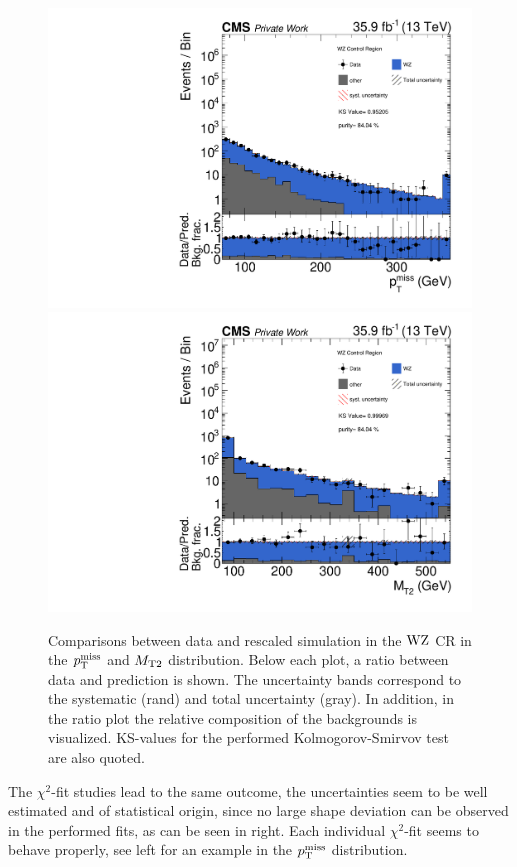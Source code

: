 \begin{figure}[tbp]
 \centering
 \includegraphics[width=\pairwidth]{figures/plots_CR_wz/CRWZ_LL_nom_met_log}
 \includegraphics[width=\pairwidth]{figures/plots_CR_wz/CRWZ_LL_nom_mt2_log}
 \caption{Comparisons between data and rescaled simulation in the $\mathrm{W}\mathrm{Z}$ CR in the $p_{\mathrm{T}}^\text{miss}$ and $M_{\mathrm{T2}}$ distribution. Below each plot, a ratio between data and prediction is shown. The uncertainty bands correspond to the systematic (rand) and total uncertainty (gray). In addition, in the ratio plot the relative composition of the backgrounds is visualized. KS-values for the performed Kolmogorov-Smirvov test are also quoted.}
 \label{fig:CRWZ}
\end{figure}
The $\chi^2$-fit studies lead to the same outcome, the uncertainties seem to be well estimated and of statistical origin, since no large shape deviation can be observed in the performed fits, as can be seen in  right. Each individual $\chi^2$-fit seems to behave properly, see  left for an example in the $p_{\mathrm{T}}^\text{miss}$ distribution.

